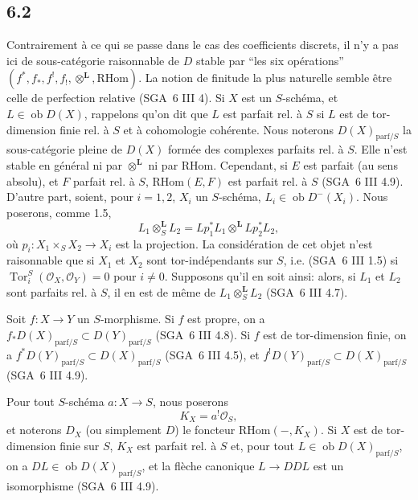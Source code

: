 \documentclass[11pt]{article}
\providecommand{\cO}{\mathcal{O}}
\DeclareMathOperator{\Tor}{Tor}
\providecommand{\RHom}{\mathrm{RHom}}
\providecommand{\RHom}{\mathrm{RHom}}
\providecommand{\RHom}{\mathrm R\mathcal{H}om}
\begin{document}
\subsection*{6.2}
Contrairement à ce qui se passe dans le cas des coefficients discrets, il n'y a pas ici de sous-catégorie raisonnable de $D$ stable par ``les six opérations'' $(f^*,f_*,f^!,f_!,\otimes^{\mathbf L},\RHom)$. La notion de finitude la plus naturelle semble être celle de perfection relative (SGA~6 III 4). Si $X$ est un $S$-schéma, et $L\in\operatorname{ob}D(X)$, rappelons qu'on dit que $L$ est parfait rel. à $S$ si $L$ est de tor-dimension finie rel. à $S$ et à cohomologie cohérente. Nous noterons $D(X)_{\mathrm{parf}/S}$ la sous-catégorie pleine de $D(X)$ formée des complexes parfaits rel. à $S$. Elle n'est stable en général ni par $\otimes^{\mathbf L}$ ni par $\RHom$. Cependant, si $E$ est parfait (au sens absolu), et $F$ parfait rel. à $S$, $\RHom(E,F)$ est parfait rel. à $S$ (SGA~6 III 4.9). D'autre part, soient, pour $i=1,2$, $X_i$ un $S$-schéma, $L_i\in\operatorname{ob}D^{-}(X_i)$. Nous poserons, comme 1.5,
\[
L_1\otimes_S^{\mathbf L}L_2=Lp_1^*L_1\otimes^{\mathbf L}Lp_2^*L_2,
\]
où $p_i:X_1\times_SX_2\to X_i$ est la projection. La considération de cet objet n'est raisonnable que si $X_1$ et $X_2$ sont tor-indépendants sur $S$, i.e. (SGA~6 III 1.5) si $\Tor_i^S(\cO_X,\cO_Y)=0$ pour $i\ne0$. Supposons qu'il en soit ainsi: alors, si $L_1$ et $L_2$ sont parfaits rel. à $S$, il en est de même de $L_1\otimes_S^{\mathbf L}L_2$ (SGA~6 III 4.7).

Soit $f:X\to Y$ un $S$-morphisme. Si $f$ est propre, on a $f_*D(X)_{\mathrm{parf}/S}\subset D(Y)_{\mathrm{parf}/S}$ (SGA~6 III 4.8). Si $f$ est de tor-dimension finie, on a $f^*D(Y)_{\mathrm{parf}/S}\subset D(X)_{\mathrm{parf}/S}$ (SGA~6 III 4.5), et $f^!D(Y)_{\mathrm{parf}/S}\subset D(X)_{\mathrm{parf}/S}$ (SGA~6 III 4.9).

Pour tout $S$-schéma $a:X\to S$, nous poserons
\begin{equation}
\tag{6.2.1}
K_X=a^!\cO_S,
\end{equation}
et noterons $D_X$ (ou simplement $D$) le foncteur $\RHom(-,K_X)$. Si $X$ est de tor-dimension finie sur $S$, $K_X$ est parfait rel. à $S$ et, pour tout $L\in\operatorname{ob}D(X)_{\mathrm{parf}/S}$, on a $DL\in\operatorname{ob}D(X)_{\mathrm{parf}/S}$, et la flèche canonique $L\to DDL$ est un isomorphisme (SGA~6 III 4.9).
\end{document}
